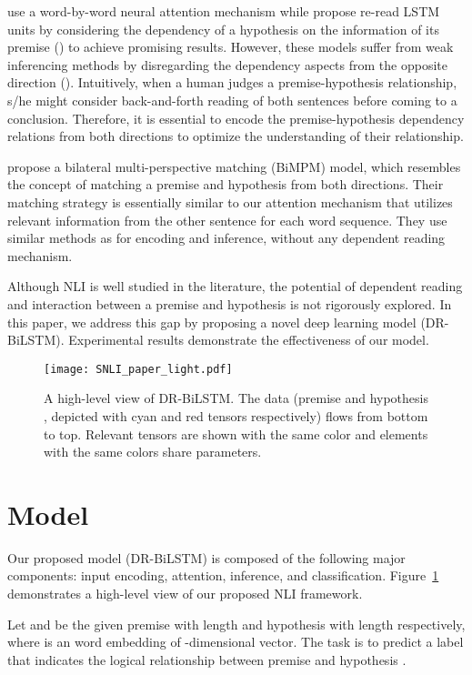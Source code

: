 \documentclass[11pt,a4paper]{article}
\begin{document}
	\citet{Rocktaschel2015} use a word-by-word neural attention mechanism while \citet{re-read} propose re-read LSTM units by considering the dependency of a hypothesis on the information of its premise () to achieve promising results. However, these models suffer from weak inferencing methods by disregarding the dependency aspects from the opposite direction (). Intuitively, when a human judges a premise-hypothesis relationship, s/he might consider back-and-forth reading of both sentences before coming to a conclusion. Therefore, it is essential to encode the premise-hypothesis dependency relations from both directions to optimize the understanding of their relationship.    
	
	\citet{ibm2017} propose a bilateral multi-perspective matching (BiMPM) model, which resembles the concept of matching a premise and hypothesis from both directions. Their matching strategy is essentially similar to our attention mechanism that utilizes relevant information from the other sentence for each word sequence. They use similar methods as \citet{him2017} for encoding and inference, without any dependent reading mechanism. 
	
	Although NLI is well studied in the literature, the potential of dependent reading and interaction between a premise and hypothesis is not rigorously explored. In this paper, we address this gap by proposing a novel deep learning model (DR-BiLSTM). Experimental results demonstrate the effectiveness of our model.
	
	\begin{figure}[ht]
		\centering
		\texttt{[image: SNLI\_paper\_light.pdf]}
		\caption{A high-level view of DR-BiLSTM. The data (premise  and hypothesis , depicted with cyan and red tensors respectively) flows from bottom to top. Relevant tensors are shown with the same color and elements with the same colors share parameters. \label{fig:model}}
	\end{figure}
	
	\section{Model}
	Our proposed model (DR-BiLSTM) is composed of the following major components: input encoding, attention, inference, and classification. Figure~\ref{fig:model} demonstrates a high-level view of our proposed NLI framework. 
	
	Let  and  be the given premise with length  and hypothesis with length  respectively, where  is an word embedding of -dimensional vector. The task is to predict a label  that indicates the logical relationship between premise  and hypothesis .
	
\end{document}

